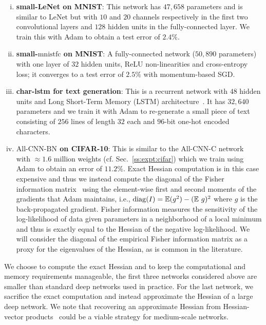 \documentclass[10pt]{article}
\newcommand{\mnistfc}{\textrm{mnistfc}}
\newcommand{\lenet}{\textrm{LeNet}}
\newcommand{\allcnn}{\textrm{All-CNN-BN}}
\begin{document}
\begin{enumerate}[(i)]
\item \textbf{small-LeNet on MNIST}: This network has $47,658$ parameters and is similar to $\lenet$ but with $10$ and $20$ channels respectively in the first two convolutional layers and $128$ hidden units in the fully-connected layer. We train this with Adam to obtain a test error of $2.4\%$.
%
\item \textbf{small-$\mnistfc$ on MNIST}: A fully-connected network ($50,890$ parameters) with one layer of $32$ hidden units, ReLU non-linearities and cross-entropy loss; it converges to a test error of $2.5\%$ with momentum-based SGD.
%
\item \textbf{char-lstm for text generation}: This is a recurrent network with $48$ hidden units and Long Short-Term Memory (LSTM) architecture~\citep{hochreiter1997long}. It has $32,640$ parameters and we train it with Adam to re-generate a small piece of text consisting of $256$ lines of length $32$ each and $96$-bit one-hot encoded characters.
%
\item \textbf{$\allcnn$ on CIFAR-10}: This is similar to the All-CNN-C network~\citep{springenberg2014striving} with $\approx 1.6$ million weights (cf. Sec.~\ref{ss:expt:cifar}) which we train using Adam to obtain an error of $11.2\%$. Exact Hessian computation is in this case expensive and thus we instead compute the diagonal of the Fisher information matrix~\citep{wasserman2013all} using the element-wise first and second moments of the gradients that Adam maintains, i.e., $\mathrm{diag} (I) = \mathbb{E}(g^2) - (\mathbb{E}\ g)^2$ where $g$ is the back-propagated gradient. Fisher information measures the sensitivity of the log-likelihood of data given parameters in a neighborhood of a local minimum and thus is exactly equal to the Hessian of the negative log-likelihood. We will consider the diagonal of the empirical Fisher information matrix as a proxy for the eigenvalues of the Hessian, as is common in the literature.
\end{enumerate}

We choose to compute the exact Hessian and to keep the computational and memory requirements manageable, the first three networks considered above are smaller than standard deep networks used in practice. For the last network, we sacrifice the exact computation and instead approximate the Hessian of a large deep network. We note that recovering an approximate Hessian from Hessian-vector products~\citep{pearlmutter1994fast} could be a viable strategy for medium-scale networks.
\end{document}
